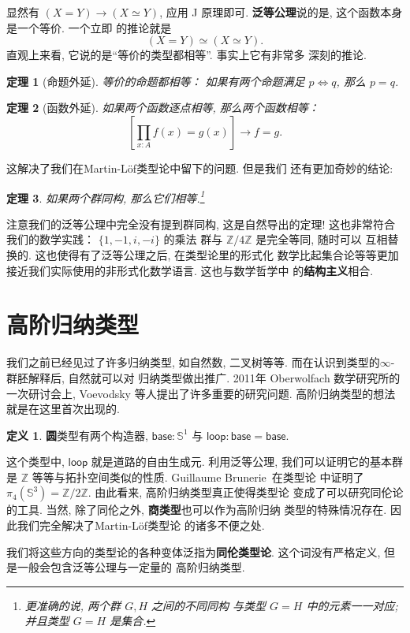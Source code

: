 \documentclass[UTF8]{ctexbook}
\newcommand{\cons}[1]{\textsf{#1}}
\theoremstyle{plain}
\newtheorem{theorem}{定理}[chapter]
\theoremstyle{definition}
\newtheorem{definition}{定义}[chapter]
\theoremstyle{remark}
\begin{document}
显然有 \((X = Y) \to (X \simeq Y)\), 应用 J 原理即可.
\textbf{泛等公理}说的是, 这个函数本身是一个等价. 一个立即
的推论就是
\[(X = Y) \simeq (X \simeq Y).\]
直观上来看, 它说的是“等价的类型都相等”. 事实上它有非常多
深刻的推论.
\begin{theorem}[命题外延]
等价的命题都相等： 如果有两个命题满足
\(p \iff q\), 那么 \(p = q\).
\end{theorem}
\begin{theorem}[函数外延]
如果两个函数逐点相等, 那么两个函数相等：
\[\left[\prod_{x:A} f(x) = g(x)\right] \to f = g.\]
\end{theorem}
这解决了我们在Martin-L\"of类型论中留下的问题. 但是我们
还有更加奇妙的结论:
\begin{theorem}
如果两个群同构, 那么它们相等.\footnote{更准确的说, 两个群 \(G, H\) 之间的不同同构
与类型 \(G = H\) 中的元素一一对应; 并且类型 \(G = H\) 是集合.}
\end{theorem}
注意我们的泛等公理中完全没有提到群同构, 这是自然导出的定理!
这也非常符合我们的数学实践： \(\{1,-1,i,-i\}\) 的乘法
群与 \(\mathbb Z/4\mathbb Z\) 是完全等同, 随时可以
互相替换的. 这也使得有了泛等公理之后, 在类型论里的形式化
数学比起集合论等等更加接近我们实际使用的非形式化数学语言.
这也与数学哲学中
的\textbf{结构主义}相合.~\cite{awodey:2013:structuralism}

\section{高阶归纳类型}
我们之前已经见过了许多归纳类型, 如自然数, 二叉树等等.
而在认识到类型的\(\infty\)-群胚解释后, 自然就可以对
归纳类型做出推广. 2011年 Oberwolfach 数学研究所的
一次研讨会上, Voevodsky 等人提出了许多重要的研究问题.
高阶归纳类型的想法就是在这里首次出现的.

\begin{definition}
\textbf{圆}类型有两个构造器, \(\cons{base} : \mathbb S^1\)
与 \(\cons{loop} : \cons{base} = \cons{base}\).
\end{definition}
这个类型中, \(\cons{loop}\) 就是道路的自由生成元.
利用泛等公理, 我们可以证明它的基本群是 \(\mathbb Z\)
等等与拓扑空间类似的性质. Guillaume Brunerie~\cite{brunerie:2016:number}在类型论
中证明了 \(\pi_4(\mathbb S^3) = \mathbb Z / 2\mathbb Z\).
由此看来, 高阶归纳类型真正使得类型论
变成了可以研究同伦论的工具.
当然, 除了同伦之外, \textbf{商类型}也可以作为高阶归纳
类型的特殊情况存在. 因此我们完全解决了Martin-L\"of类型论
的诸多不便之处.

我们将这些方向的类型论的各种变体泛指为\textbf{同伦类型论}.
这个词没有严格定义, 但是一般会包含泛等公理与一定量的
高阶归纳类型.
\end{document}
